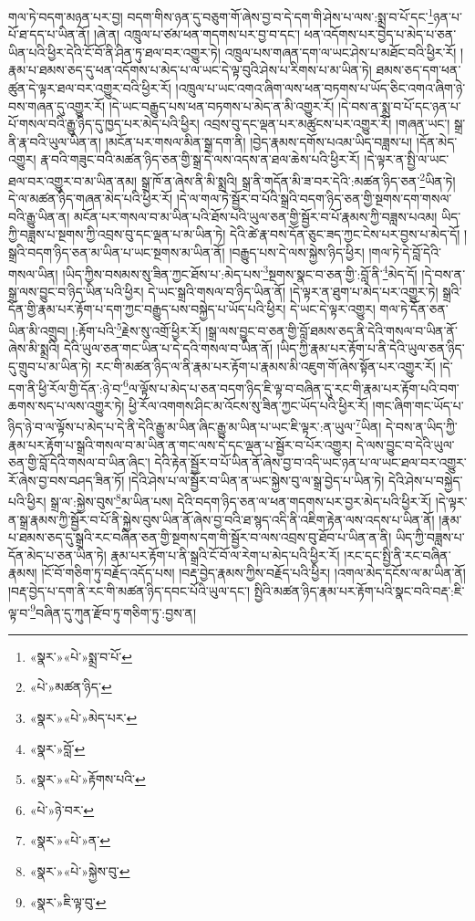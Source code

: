 གལ་ཏེ་བདག་མཉན་པར་བྱ། བདག་གིས་ཉན་དུ་བཅུག་གོ་ཞེས་བྱ་བ་དེ་དག་གི་ཤེས་པ་ལས་:སྨྲ་བ་པོ་དང་\footnote{«སྣར་»«པེ་»སྨྲ་བ་པོ་}ཉན་པ་པོ་ཐ་དད་པ་ཡིན་ནོ། །ཞེ་ན། འཁྲུལ་པ་ཙམ་ཕན་གདགས་པར་བྱ་བ་དང་། ཕན་འདོགས་པར་བྱེད་པ་མེད་པ་ཅན་ཡིན་པའི་ཕྱིར་དེའི་ངོ་བོ་ནི་ཤིན་ཏུ་ཐལ་བར་འགྱུར་ཏེ། འཁྲུལ་པས་གཞན་དག་ལ་ཡང་ཤེས་པ་མཐོང་བའི་ཕྱིར་རོ། །རྣམ་པ་ཐམས་ཅད་དུ་ཕན་འདོགས་པ་མེད་པ་ལ་ཡང་དེ་ལྟ་བུའི་ཤེས་པ་རིགས་པ་མ་ཡིན་ཏེ། ཐམས་ཅད་དག་ཕན་ཚུན་དེ་ལྟར་ཐལ་བར་འགྱུར་བའི་ཕྱིར་རོ། །འཁྲུལ་པ་ཡང་འགའ་ཞིག་ལས་ཕན་བཏགས་པ་ཡོད་ཅིང་འགའ་ཞིག་ཉེ་བས་གཞན་དུ་འགྱུར་རོ། །དེ་ཡང་བརྒྱུད་པས་ཕན་བཏགས་པ་མེད་ན་མི་འགྱུར་རོ། །དེ་བས་ན་སྨྲ་བ་པོ་དང་ཉན་པ་པོ་གསལ་བའི་རྒྱུ་ཉིད་དུ་ཁྱད་པར་མེད་པའི་ཕྱིར། འབྲས་བུ་དང་ལྡན་པར་མཚུངས་པར་འགྱུར་རོ། །གཞན་ཡང་། སྒྲ་ནི་རྣ་བའི་ཡུལ་ཡིན་ན། །མངོན་པར་གསལ་མིན་སྒྲ་དག་ནི། །བྱེད་རྣམས་དགོས་པའམ་ཡིད་བཟླས་པ། །དོན་མེད་འགྱུར། རྣ་བའི་གཟུང་བའི་མཚན་ཉིད་ཅན་གྱི་སྒྲ་དེ་ལས་འདས་ན་ཐལ་ཆེས་པའི་ཕྱིར་རོ། །དེ་ལྟར་ན་སྤྱི་ལ་ཡང་ཐལ་བར་འགྱུར་བ་མ་ཡིན་ནམ། སྒྲ་ཁོ་ན་ཞེས་ནི་མི་སྨྲའི། སྒྲ་ནི་གདོན་མི་ཟ་བར་དེའི་:མཚན་ཉིད་ཅན་\footnote{«པེ་»མཚན་ཉིད་}ཡིན་ཏེ། དེ་ལ་མཚན་ཉིད་གཞན་མེད་པའི་ཕྱིར་རོ། །དེ་ལ་གལ་ཏེ་སྦྱོར་བ་པོའི་སྒྲའི་བདག་ཉིད་ཅན་གྱི་སྔགས་དག་གསལ་བའི་རྒྱུ་ཡིན་ན། མངོན་པར་གསལ་བ་མ་ཡིན་པའི་ཐོས་པའི་ཡུལ་ཅན་གྱི་སྦྱོར་བ་པོ་རྣམས་ཀྱི་བཟླས་པའམ། ཡིད་ཀྱི་བཟླས་པ་སྔགས་ཀྱི་འབྲས་བུ་དང་ལྡན་པ་མ་ཡིན་ཏེ། དེའི་ཚེ་རྣ་བས་དོན་ཅུང་ཟད་ཀྱང་ངེས་པར་བྱས་པ་མེད་དོ། །སྒྲའི་བདག་ཉིད་ཅན་མ་ཡིན་པ་ཡང་སྔགས་མ་ཡིན་ནོ། །བརྒྱུད་པས་དེ་ལས་སྐྱེས་ཉིད་ཕྱིར། །གལ་ཏེ་དེ་བློ་དེའི་གསལ་ཡིན། །ཡིད་ཀྱིས་བསམས་སུ་ཟིན་ཀྱང་ཐོས་པ་:མེད་པས་\footnote{«སྣར་»«པེ་»མེད་པར་}སྔགས་སྣང་བ་ཅན་གྱི་:བློ་ནི་\footnote{«སྣར་»བློ་}མེད་དོ། །དེ་བས་ན་སྒྲ་ལས་བྱུང་བ་ཉིད་ཡིན་པའི་ཕྱིར། དེ་ཡང་སྒྲའི་གསལ་བ་ཉིད་ཡིན་ནོ། །དེ་ལྟར་ན་ཐུག་པ་མེད་པར་འགྱུར་ཏེ། སྒྲའི་དོན་གྱི་རྣམ་པར་རྟོག་པ་དག་ཀྱང་བརྒྱུད་པས་བསྐྱེད་པ་ཡོད་པའི་ཕྱིར། དེ་ཡང་དེ་ལྟར་འགྱུར། གལ་ཏེ་དོན་ཅན་ཡིན་མི་འགྲུབ། །:རྟོག་པའི་\footnote{«སྣར་»«པེ་»རྟོགས་པའི་}རྗེས་སུ་འགྲོ་ཕྱིར་རོ། །སྒྲ་ལས་བྱུང་བ་ཅན་གྱི་བློ་ཐམས་ཅད་ནི་དེའི་གསལ་བ་ཡིན་ནོ་ཞེས་མི་སྨྲའི། དེའི་ཡུལ་ཅན་གང་ཡིན་པ་དེ་དའི་གསལ་བ་ཡིན་ནོ། །ཡིད་ཀྱི་རྣམ་པར་རྟོག་པ་ནི་དེའི་ཡུལ་ཅན་ཉིད་དུ་གྲུབ་པ་མ་ཡིན་ཏེ། རང་གི་མཚན་ཉིད་ལ་ནི་རྣམ་པར་རྟོག་པ་རྣམས་མི་འཇུག་གོ་ཞེས་སྟོན་པར་འགྱུར་རོ། །དེ་དག་ནི་ཕྱི་རོལ་གྱི་དོན་:ཉེ་བ་\footnote{«པེ་»ཉེ་བར་}ལ་ལྟོས་པ་མེད་པ་ཅན་བདག་ཉིད་ཇི་ལྟ་བ་བཞིན་དུ་རང་གི་རྣམ་པར་རྟོག་པའི་བག་ཆགས་སད་པ་ལས་འགྱུར་ཏེ། ཕྱི་རོལ་འགགས་ཤིང་མ་འོངས་སུ་ཟིན་ཀྱང་ཡོད་པའི་ཕྱིར་རོ། །གང་ཞིག་གང་ཡོད་པ་ཉིད་ཉེ་བ་ལ་ལྟོས་པ་མེད་པ་དེ་ནི་དེའི་རྒྱུ་མ་ཡིན་ཞིང་རྒྱུ་མ་ཡིན་པ་ཡང་ཇི་ལྟར་:ན་ཡུལ་\footnote{«སྣར་»«པེ་»ན་}ཡིན། དེ་བས་ན་ཡིད་ཀྱི་རྣམ་པར་རྟོག་པ་སྒྲའི་གསལ་བ་མ་ཡིན་ན་གང་ལས་དེ་དང་ལྡན་པ་སྦྱོར་བ་པོར་འགྱུར། དེ་ལས་བྱུང་བ་དེའི་ཡུལ་ཅན་གྱི་བློ་དེའི་གསལ་བ་ཡིན་ཞིང་། དེའི་རྟེན་སྦྱོར་བ་པོ་ཡིན་ནོ་ཞེས་བྱ་བ་འདི་ཡང་ཉན་པ་ལ་ཡང་ཐལ་བར་འགྱུར་རོ་ཞེས་བྱ་བས་བཤད་ཟིན་ཏོ། །དེའི་ཤེས་པ་ལ་སྦྱོར་བ་ཡིན་ན་ཡང་སྐྱེས་བུ་ལ་སྒྲ་བྱེད་པ་ཡིན་ཏེ། དེའི་ཤེས་པ་བསྐྱེད་པའི་ཕྱིར། སྒྲ་ལ་:སྐྱེས་བུས་\footnote{«སྣར་»«པེ་»སྐྱེས་བུ་}མ་ཡིན་པས། དེའི་བདག་ཉིད་ཅན་ལ་ཕན་གདགས་པར་བྱར་མེད་པའི་ཕྱིར་རོ། །དེ་ལྟར་ན་སྒྲ་རྣམས་ཀྱི་སྦྱོར་བ་པོ་ནི་སྐྱེས་བུས་ཡིན་ནོ་ཞེས་བྱ་བའི་ཐ་སྙད་འདི་ནི་འཇིག་རྟེན་ལས་འདས་པ་ཡིན་ནོ། །རྣམ་པ་ཐམས་ཅད་དུ་སྒྲའི་རང་བཞིན་ཅན་གྱི་སྔགས་དག་གི་སྦྱོར་བ་ལས་འབྲས་བུ་ཐོབ་པ་ཡིན་ན་ནི། ཡིད་ཀྱི་བཟླས་པ་དོན་མེད་པ་ཅན་ཡིན་ཏེ། རྣམ་པར་རྟོག་པ་ནི་སྒྲའི་ངོ་བོ་ལ་རེག་པ་མེད་པའི་ཕྱིར་རོ། །རང་དང་སྤྱི་ནི་རང་བཞིན་རྣམས། །ངོ་བོ་གཅིག་ཏུ་བརྗོད་འདོད་པས། །བརྡ་བྱེད་རྣམས་ཀྱིས་བརྗོད་པའི་ཕྱིར། །འགལ་མེད་དངོས་ལ་མ་ཡིན་ནོ། །བརྡ་བྱེད་པ་དག་ནི་རང་གི་མཚན་ཉིད་དབང་པོའི་ཡུལ་དང་། སྤྱིའི་མཚན་ཉིད་རྣམ་པར་རྟོག་པའི་སྣང་བའི་བརྡ་:ཇི་ལྟ་བ་\footnote{«སྣར་»ཇི་ལྟ་བུ་}བཞིན་དུ་ཀུན་རྫོབ་ཏུ་གཅིག་ཏུ་:བྱས་ན། 